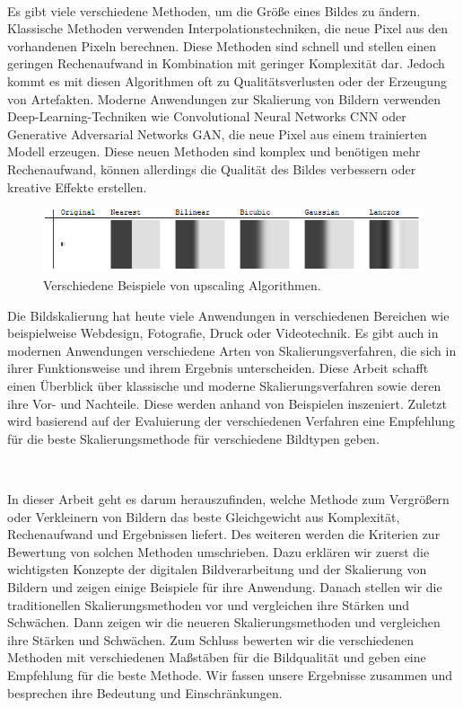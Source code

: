 ~

Es gibt viele verschiedene Methoden, um die Größe eines Bildes zu ändern. 
Klassische Methoden verwenden Interpolationstechniken, die neue Pixel aus den vorhandenen Pixeln berechnen. 
Diese Methoden sind schnell und stellen einen geringen Rechenaufwand in Kombination mit geringer Komplexität dar. 
Jedoch kommt es mit diesen Algorithmen oft zu Qualitätsverlusten oder der Erzeugung von Artefakten. 
Moderne Anwendungen zur Skalierung von Bildern verwenden Deep-Learning-Techniken wie Convolutional Neural Networks \ac{CNN} oder Generative Adversarial Networks \ac{GAN}, die neue Pixel aus einem trainierten Modell erzeugen. 
Diese neuen Methoden sind komplex und benötigen mehr Rechenaufwand, können allerdings die Qualität des Bildes verbessern oder kreative Effekte erstellen.

\begin{figure}[h!]
    \vspace{8mm}
    \centering
    \includegraphics{img/xaR8r.png}
    \caption{Verschiedene Beispiele von upscaling Algorithmen\cite{whuber.lanczos}.}
    \label{fig:my_label}
    \vspace{4mm}
\end{figure}

Die Bildskalierung hat heute viele Anwendungen in verschiedenen Bereichen wie beispielweise Webdesign, Fotografie, Druck oder Videotechnik. 
Es gibt auch in modernen Anwendungen verschiedene Arten von Skalierungsverfahren, die sich in ihrer Funktionsweise und ihrem Ergebnis unterscheiden. 
Diese Arbeit schafft einen Überblick über klassische und moderne Skalierungsverfahren sowie deren ihre Vor- und Nachteile. 
Diese werden anhand von Beispielen inszeniert. 
Zuletzt wird basierend auf der Evaluierung der verschiedenen Verfahren eine Empfehlung für die beste Skalierungsmethode für verschiedene Bildtypen geben. 

~

In dieser Arbeit geht es darum herauszufinden, welche Methode zum Vergrößern oder Verkleinern von Bildern das beste Gleichgewicht aus Komplexität, Rechenaufwand und Ergebnissen liefert. 
Des weiteren werden die Kriterien zur Bewertung von solchen Methoden umschrieben. 
Dazu erklären wir zuerst die wichtigsten Konzepte der digitalen Bildverarbeitung und der Skalierung von Bildern und zeigen einige Beispiele für ihre Anwendung. Danach stellen wir die traditionellen Skalierungsmethoden vor und vergleichen ihre Stärken und Schwächen. Dann zeigen wir die neueren Skalierungsmethoden und vergleichen ihre Stärken und Schwächen. Zum Schluss bewerten wir die verschiedenen Methoden mit verschiedenen Maßstäben für die Bildqualität und geben eine Empfehlung für die beste Methode. Wir fassen unsere Ergebnisse zusammen und besprechen ihre Bedeutung und Einschränkungen.
\newpage